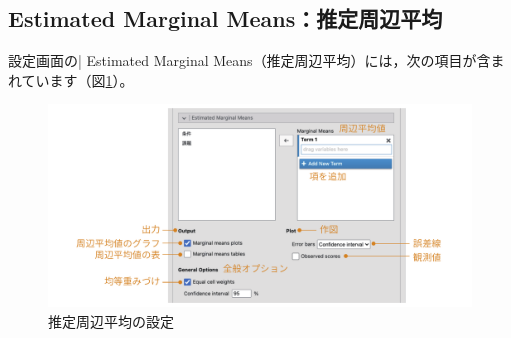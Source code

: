 \documentclass[
  12pt,
  a5jpaper,
  lualatex, ja=standard]{bxjsbook}
\begin{document}
\hypertarget{sub:ANOVA-anova-emm}{%
\subsection{Estimated Marginal Means：推定周辺平均}\label{sub:ANOVA-anova-emm}}

設定画面の\colorbox{bar}{\textcolor{gmoji2}{| Estimated Marginal Means}}（推定周辺平均）には，次の項目が含まれています（図\ref{fig:ANOVA-anova-emm}）。

\begin{figure}[!ht]

{\centering \includegraphics[width=1\linewidth]{images/ANOVA/anova-emm} 

}

\caption{推定周辺平均の設定}\label{fig:ANOVA-anova-emm}
\end{figure}
\end{document}
